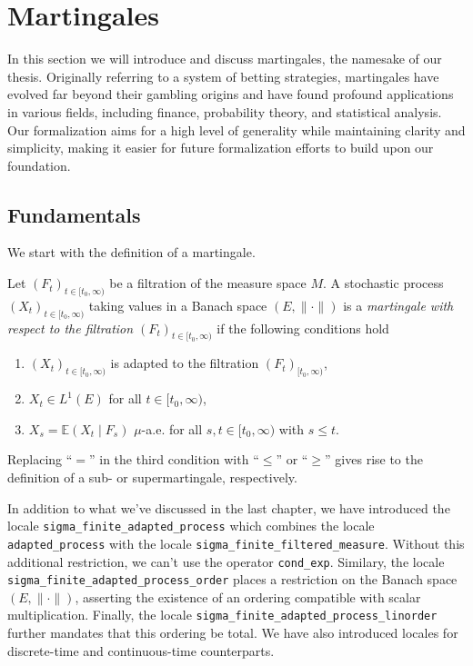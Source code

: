
\chapter{Martingales}\label{chapter:martingales}

In this section we will introduce and discuss martingales, the namesake of our thesis. Originally referring to a system of betting strategies, martingales have evolved far beyond their gambling origins and have found profound applications in various fields, including finance, probability theory, and statistical analysis. Our formalization aims for a high level of generality while maintaining clarity and simplicity, making it easier for future formalization efforts to build upon our foundation.

\section{Fundamentals}

We start with the definition of a martingale.

\begin{definition}
	Let $(F_t)_{t \in [t_0,\infty)}$ be a filtration of the measure space $M$. A stochastic process $(X_t)_{t \in [t_0,\infty)}$ taking values in a Banach space $(E, \lVert \cdot \rVert)$ is a \textit{martingale with respect to the filtration $(F_t)_{t \in [t_0,\infty)}$} if the following conditions hold
	\begin{enumerate}
	\item $(X_t)_{t \in [t_0,\infty)}$ is adapted to the filtration $(F_t)_{[t_0,\infty)}$,
	\item $X_t \in L^1(E)$ for all $t \in [t_0, \infty)$,
	\item $X_s = \mathbb{E}(X_t \;\vert\; F_s)$ $\mu$-a.e. for all $s,t \in [t_0,\infty)$ with $s \le t$.
	\end{enumerate}
	Replacing ``$=$'' in the third condition with ``$\le$'' or ``$\ge$'' gives rise to the definition of a sub- or supermartingale, respectively.
\end{definition}

\begin{remark}
 In addition to what we've discussed in the last chapter, we have introduced the locale \texttt{sigma\_finite\_adapted\_process} which combines the locale \texttt{adapted\_process} with the locale \texttt{sigma\_finite\_filtered\_measure}. Without this additional restriction, we can't use the operator \texttt{cond\_exp}. Similary, the locale \texttt{sigma\_finite\_adapted\_process\-\_order} places a restriction on the Banach space $(E, \lVert \cdot \rVert)$, asserting the existence of an ordering compatible with scalar multiplication. Finally, the locale \texttt{sigma\_finite\_adapted\-\_process\_linorder} further mandates that this ordering be total. We have also introduced locales for discrete-time and continuous-time counterparts.
\end{remark}

